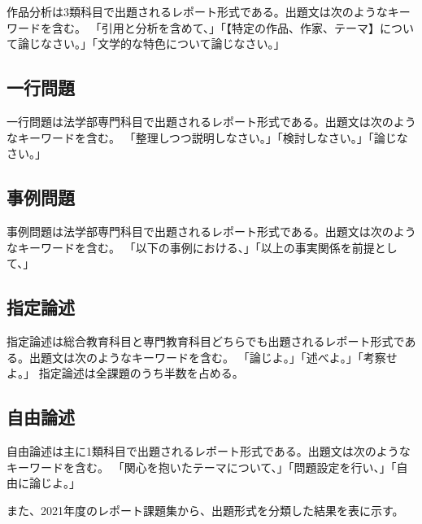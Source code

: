 \documentclass[11pt,a4paper,uplatex]{jsarticle}
\begin{document}
作品分析は3類科目で出題されるレポート形式である。出題文は次のようなキーワードを含む。
「引用と分析を含めて、」「【特定の作品、作家、テーマ】について論じなさい。」「文学的な特色について論じなさい。」

\subsection*{一行問題}

一行問題は法学部専門科目で出題されるレポート形式である。出題文は次のようなキーワードを含む。
「整理しつつ説明しなさい。」「検討しなさい。」「論じなさい。」

\subsection*{事例問題}

事例問題は法学部専門科目で出題されるレポート形式である。出題文は次のようなキーワードを含む。
「以下の事例における、」「以上の事実関係を前提として、」

\subsection*{指定論述}

指定論述は総合教育科目と専門教育科目どちらでも出題されるレポート形式である。出題文は次のようなキーワードを含む。
「論じよ。」「述べよ。」「考察せよ。」
指定論述は全課題のうち半数を占める。

\subsection*{自由論述}

自由論述は主に1類科目で出題されるレポート形式である。出題文は次のようなキーワードを含む。
「関心を抱いたテーマについて、」「問題設定を行い、」「自由に論じよ。」

\clearpage

また、2021年度のレポート課題集から、出題形式を分類した結果を表に示す。
\end{document}
